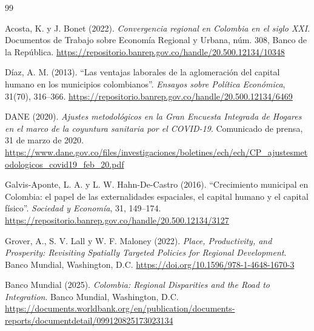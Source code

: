 \clearpage
{}
{}
\begin{thebibliography}{99}

Acosta, K. y J. Bonet (2022).
\newblock \emph{Convergencia regional en Colombia en el siglo XXI}.
\newblock Documentos de Trabajo sobre Economía Regional y Urbana, núm. 308, Banco de la República.
\newblock \url{https://repositorio.banrep.gov.co/handle/20.500.12134/10348}

Díaz, A. M. (2013).
\newblock ``Las ventajas laborales de la aglomeración del capital humano en los municipios colombianos''.
\newblock \emph{Ensayos sobre Política Económica}, 31(70), 316--366.
\newblock \url{https://repositorio.banrep.gov.co/handle/20.500.12134/6469}

DANE (2020).
\newblock \emph{Ajustes metodológicos en la Gran Encuesta Integrada de Hogares en el marco de la coyuntura sanitaria por el COVID-19}.
\newblock Comunicado de prensa, 31 de marzo de 2020.
\newblock \url{https://www.dane.gov.co/files/investigaciones/boletines/ech/ech/CP_ajustesmetodologicos_covid19_feb_20.pdf}

Galvis-Aponte, L. A. y L. W. Hahn-De-Castro (2016).
\newblock ``Crecimiento municipal en Colombia: el papel de las externalidades espaciales, el capital humano y el capital físico''.
\newblock \emph{Sociedad y Economía}, 31, 149--174.
\newblock \url{https://repositorio.banrep.gov.co/handle/20.500.12134/3127}

Grover, A., S. V. Lall y W. F. Maloney (2022).
\newblock \emph{Place, Productivity, and Prosperity: Revisiting Spatially Targeted Policies for Regional Development}.
\newblock Banco Mundial, Washington, D.C.
\newblock \url{https://doi.org/10.1596/978-1-4648-1670-3}

Banco Mundial (2025).
\newblock \emph{Colombia: Regional Disparities and the Road to Integration}.
\newblock Banco Mundial, Washington, D.C.
\newblock \url{https://documents.worldbank.org/en/publication/documents-reports/documentdetail/099120825173023134}

\end{thebibliography}
